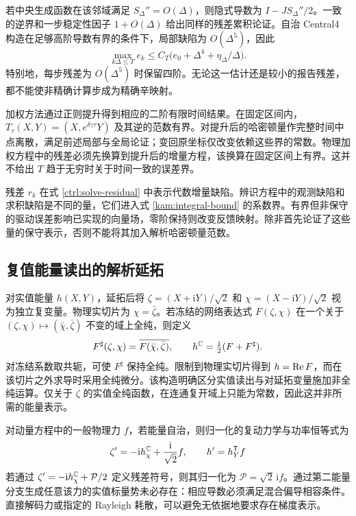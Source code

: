 若中央生成函数在该邻域满足 $S_\Delta''=O(\Delta)$，则隐式导数为 $I-JS_\Delta''/2$。一致的逆界和一步稳定性因子 $1+O(\Delta)$ 给出同样的残差累积论证。自治 Central4 构造在足够高阶导数有界的条件下，局部缺陷为 $O(\Delta^5)$，因此
\[
 \max_{k\Delta\le T}e_k
       \le C_T\bigl(e_0+\Delta^4+\eta_\Delta/\Delta\bigr).
\]
特别地，每步残差为 $O(\Delta^5)$ 时保留四阶。无论这一估计还是较小的报告残差，都不能使非精确计算步成为精确辛映射。

加权方法通过正则提升得到相应的二阶有限时间结果。在固定区间内，$T_\tau(X,Y)=(X,e^{\delta\gamma\tau}Y)$ 及其逆的范数有界。对提升后的哈密顿量作完整时间中点离散，满足前述局部与全局论证；变回原坐标仅改变依赖这些界的常数。物理加权方程中的残差必须先换算到提升后的增量方程，该换算在固定区间上有界。这并不给出 $T$ 趋于无穷时关于时间一致的误差界。

残差 $r_k$ 在式 \eqref{ctrl:solve-residual} 中表示代数增量缺陷。辨识方程中的观测缺陷和求积缺陷是不同的量，它们进入式 \eqref{kam:integral-bound} 的系数界。有界但非保守的驱动误差影响已实现的向量场，零阶保持则改变反馈映射。除非首先论证了这些量的保守表示，否则不能将其加入解析哈密顿量范数。

\subsection{复值能量读出的解析延拓}
\label{ss:analytic-extension}

对实值能量 $h(X,Y)$，延拓后将
$\zeta=(X+\mathrm iY)/\sqrt2$ 和
$\chi=(X-\mathrm iY)/\sqrt2$ 视为独立复变量。物理实切片为 $\chi=\bar\zeta$。若冻结的网络表达式 $F(\zeta,\chi)$ 在一个关于 $(\zeta,\chi)\mapsto(\bar\chi,\bar\zeta)$ 不变的域上全纯，则定义
\begin{equation}\label{ss:conjugate-extension}
 F^\sharp(\zeta,\chi)=\overline{F(\bar\chi,\bar\zeta)},
 \qquad h^{\mathbb C}=\tfrac12(F+F^\sharp).
\end{equation}
对冻结系数取共轭，可使 $F^\sharp$ 保持全纯。限制到物理实切片得到 $h=\operatorname{Re} F$，而在该切片之外求导时采用全纯微分。该构造明确区分实值读出与对延拓变量施加非全纯运算。仅关于 $\zeta$ 的实值全纯函数，在连通复开域上只能为常数，因此这并非所需的能量表示。

对动量方程中的一般物理力 $f$，若能量自治，则归一化的复动力学与功率恒等式为
\begin{equation}\label{ss:complex-force}
 \zeta'=-\mathrm i h_\chi^{\mathbb C}+\frac{\mathrm i}{\sqrt2}f,
 \qquad h'=h_Y^{\mathsf T}f
\end{equation}
若通过 $\zeta'=-\mathrm i h_\chi^{\mathbb C}+\mathcal P/2$ 定义残差符号，则其归一化为 $\mathcal P=\sqrt2\,\mathrm i f$。通过第二能量分支生成任意该力的实值标量势未必存在：相应导数必须满足混合偏导相容条件。直接解码力或指定的 Rayleigh 耗散，可以避免无依据地要求存在梯度表示。


